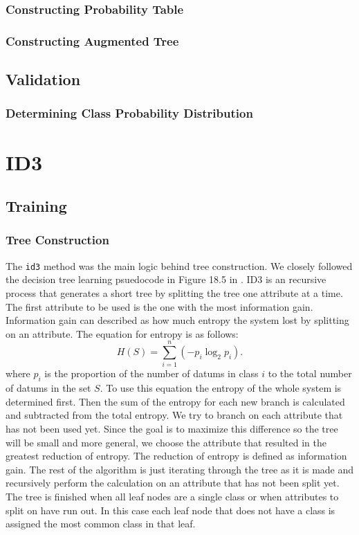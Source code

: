 \documentclass{article}
\begin{document}
		\subsubsection{Constructing Probability Table}
		\subsubsection{Constructing Augmented Tree}
	\subsection{Validation}
		\subsubsection{Determining Class Probability Distribution}
\section{ID3}
	\subsection{Training}
	\subsubsection{Tree Construction}
	The \texttt{id3} method was the main logic behind tree construction. We closely followed the decision tree learning psuedocode in Figure 18.5 in \cite{ai}. 
	ID3 is an recursive process that generates a short tree by splitting the tree one attribute at a time. 
	The first attribute to be used is the one with the most information gain. 
	Information gain can described as how much entropy the system lost by splitting on an attribute. 
	The equation for entropy is as follows:
	\begin{equation*}
	H(S) = \sum_{i=1}^{n} \left( -p_i \log_2 p_i \right). 
	\end{equation*}		
	where $p_i$ is the proportion of the number of datums in class $i$ to the total number of datums in the set $S$. 
	To use this equation the entropy of the whole system is determined first. 
	Then the sum of the entropy for each new branch is calculated and subtracted from the total entropy. We try to branch on each attribute that has not been used yet. Since the goal is to maximize this difference so the tree will be small and more general, we choose the attribute that resulted in the greatest reduction of entropy. The reduction of entropy is defined as information gain.
	The rest of the algorithm is just iterating through the tree as it is made and recursively perform the calculation on an attribute that has not been split yet. 
	The tree is finished when all leaf nodes are a single class or when attributes to split on have run out.
	In this case each leaf node that does not have a class is assigned the most common class in that leaf.
\end{document}
